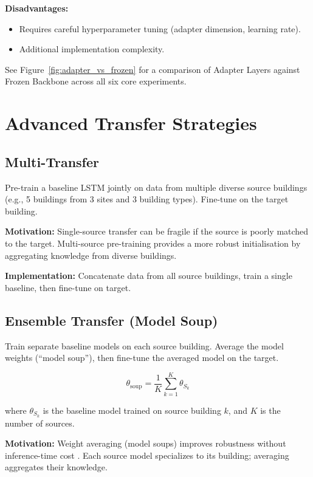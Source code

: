 \documentclass[12pt,a4paper]{report}
\begin{document}
\textbf{Disadvantages:}
\begin{itemize}
    \item Requires careful hyperparameter tuning (adapter dimension, learning rate).
    \item Additional implementation complexity.
\end{itemize}

See Figure~\ref{fig:adapter_vs_frozen} for a comparison of Adapter Layers against Frozen Backbone across all six core experiments.

\section{Advanced Transfer Strategies}

\subsection{Multi-Transfer}

Pre-train a baseline LSTM jointly on data from multiple diverse source buildings (e.g., 5 buildings from 3 sites and 3 building types). Fine-tune on the target building.

\textbf{Motivation:} Single-source transfer can be fragile if the source is poorly matched to the target. Multi-source pre-training provides a more robust initialisation by aggregating knowledge from diverse buildings.

\textbf{Implementation:} Concatenate data from all source buildings, train a single baseline, then fine-tune on target.

\subsection{Ensemble Transfer (Model Soup)}

Train separate baseline models on each source building. Average the model weights (``model soup''), then fine-tune the averaged model on the target.

\[
\theta_{\text{soup}} = \frac{1}{K} \sum_{k=1}^{K} \theta_{S_k}
\]

where \(\theta_{S_k}\) is the baseline model trained on source building \(k\), and \(K\) is the number of sources.

\textbf{Motivation:} Weight averaging (model soups) improves robustness without inference-time cost \cite{wortsman2022model}. Each source model specializes to its building; averaging aggregates their knowledge.
\end{document}
